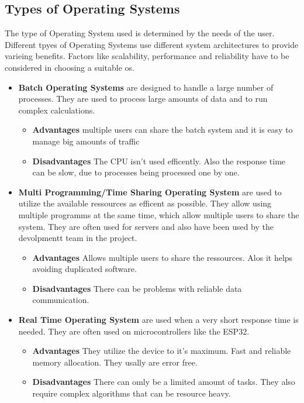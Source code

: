 \cite{WhatIsAnOs}

\subsection {Types of Operating Systems}

The type of Operating System used is determined by the needs of the user. 
Different tpyes of Operating Systems use different system architectures to provide varieing benefits.
Factors like scalability, performance and reliability have to be considered in choosing a suitable os.


\begin{itemize}

    \item \textbf{Batch Operating Systems} are designed to handle a large number of processes. They are used to process large amounts of data and to run complex calculations.
    \begin{itemize}
        \item \textbf{Advantages} multiple users can share the batch system and it is easy to manage big amounts of traffic

        \item \textbf{Disadvantages} The CPU isn't used efficently. Also the response time can be slow, due to processes being processed one by one.
    
        
    
    \end{itemize} 

    \item \textbf{Multi Programming/Time Sharing Operating System} are used to utilize the available ressources as efficent as possible. They allow using multiple programms at the same time, which allow multiple users to share the system.
    They are often used for servers and also have been used by the devolpmentt team in the project.

    \begin{itemize}
        \item \textbf{Advantages} Allows multiple users to share the ressources. Alos it helps avoiding duplicated software.
        \item \textbf{Disadvantages} There can be problems with reliable data communication. 
    \end{itemize} 


    \item \textbf{Real Time Operating System} are used when a very short response time is needed. They are often used on microcontrollers like the ESP32.
    \begin{itemize}
        \item \textbf{Advantages} They utilize the device to it's maximum. Fast and reliable memory allocation. They usally are error free.
        \item \textbf{Disadvantages} There can omly be a limited amount of tasks. They also require complex algorithms that can be resource heavy.
    \end{itemize} 
    

\end{itemize}   

